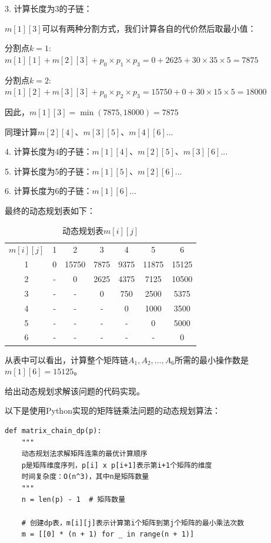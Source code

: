 \documentclass[12pt,twoside]{article}
\begin{document}
\begin{problems}
3. 计算长度为3的子链：

$m[1][3]$可以有两种分割方式，我们计算各自的代价然后取最小值：

分割点$k=1$: $m[1][1] + m[2][3] + p_0 \times p_1 \times p_3 = 0 + 2625 + 30 \times 35 \times 5 = 7875$

分割点$k=2$: $m[1][2] + m[3][3] + p_0 \times p_2 \times p_3 = 15750 + 0 + 30 \times 15 \times 5 = 18000$

因此，$m[1][3] = \min(7875, 18000) = 7875$

同理计算$m[2][4]$、$m[3][5]$、$m[4][6]$...

4. 计算长度为4的子链：$m[1][4]$、$m[2][5]$、$m[3][6]$...

5. 计算长度为5的子链：$m[1][5]$、$m[2][6]$...

6. 计算长度为6的子链：$m[1][6]$...

最终的动态规划表如下：

\begin{table}[h]
\centering
\renewcommand{\arraystretch}{1.2}
\begin{tabular}{ccccccc}
$m[i][j]$ & 1 & 2 & 3 & 4 & 5 & 6 \\
1 & 0 & 15750 & 7875 & 9375 & 11875 & 15125 \\
2 & - & 0 & 2625 & 4375 & 7125 & 10500 \\
3 & - & - & 0 & 750 & 2500 & 5375 \\
4 & - & - & - & 0 & 1000 & 3500 \\
5 & - & - & - & - & 0 & 5000 \\
6 & - & - & - & - & - & 0 \\
\end{tabular}
\caption{动态规划表$m[i][j]$}
\end{table}

从表中可以看出，计算整个矩阵链$A_1, A_2, \ldots, A_6$所需的最小操作数是$m[1][6] = 15125$。

\ppart  给出动态规划求解该问题的代码实现。

以下是使用Python实现的矩阵链乘法问题的动态规划算法：

\begin{verbatim}
def matrix_chain_dp(p):
    """
    动态规划法求解矩阵连乘的最优计算顺序
    p是矩阵维度序列，p[i] x p[i+1]表示第i+1个矩阵的维度
    时间复杂度：O(n^3)，其中n是矩阵数量
    """
    n = len(p) - 1  # 矩阵数量
    
    # 创建dp表，m[i][j]表示计算第i个矩阵到第j个矩阵的最小乘法次数
    m = [[0] * (n + 1) for _ in range(n + 1)]
    

\end{verbatim}
\end{problems}
\end{document}
